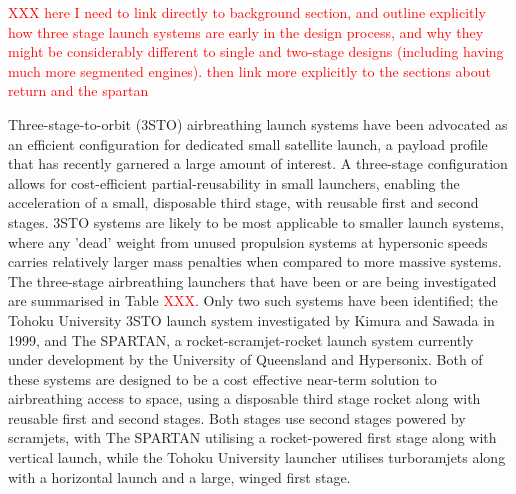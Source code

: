 \textcolor{red}{XXX here I need to link directly to background section, and outline explicitly how three stage launch systems are early in the design process, and why they might be considerably different to single and two-stage designs (including having much more segmented engines). then link more explicitly to the sections about return and the spartan}

Three-stage-to-orbit (3STO) airbreathing launch systems have been advocated as an efficient configuration for dedicated small satellite launch, a payload profile that has recently garnered a large amount of interest. A three-stage configuration allows for cost-efficient partial-reusability in small launchers, enabling the acceleration of a small, disposable third stage, with reusable first and second stages. 
3STO systems are likely to be most applicable to smaller launch systems, where any 'dead' weight from unused propulsion systems at hypersonic speeds carries relatively larger mass penalties when compared to more massive systems. 
The three-stage airbreathing launchers that have been or are being investigated are summarised in Table \textcolor{red}{XXX}. Only two such systems have been identified; the Tohoku University 3STO launch system investigated by Kimura and Sawada in 1999\cite{Kimura1999}, and The SPARTAN, a rocket-scramjet-rocket launch system currently under development by the University of Queensland and Hypersonix. Both of these systems are designed to be a cost effective near-term solution to airbreathing access to space, using a disposable third stage rocket along with reusable first and second stages. Both stages use second stages powered by scramjets, with The SPARTAN utilising a rocket-powered first stage along with vertical launch, while the Tohoku University launcher utilises turboramjets along with a horizontal launch and a large, winged first stage. 

